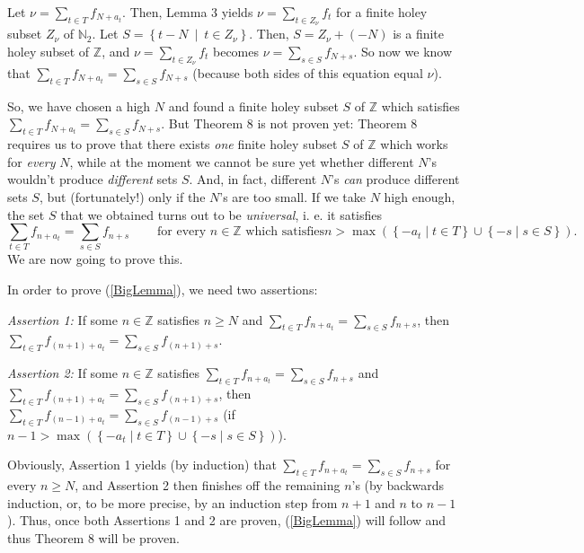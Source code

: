 \documentclass[12pt,final,notitlepage,onecolumn]{article}%
\begin{document}
Let $\nu=\sum\limits_{t\in T}f_{N+a_{t}}$. Then, Lemma 3 yields $\nu
=\sum\limits_{t\in Z_{\nu}}f_{t}$ for a finite holey subset $Z_{\nu}$ of
$\mathbb{N}_{2}$. Let $S=\left\{  t-N\ \mid\ t\in Z_{\nu}\right\}  $. Then,
$S=Z_{\nu}+\left(  -N\right)  $ is a finite holey subset of $\mathbb{Z}$, and
$\nu=\sum\limits_{t\in Z_{\nu}}f_{t}$ becomes $\nu=\sum\limits_{s\in S}%
f_{N+s}$. So now we know that $\sum\limits_{t\in T}f_{N+a_{t}}=\sum
\limits_{s\in S}f_{N+s}$ (because both sides of this equation equal $\nu$).

So, we have chosen a high $N$ and found a finite holey subset $S$ of
$\mathbb{Z}$ which satisfies $\sum\limits_{t\in T}f_{N+a_{t}}=\sum
\limits_{s\in S}f_{N+s}$. But Theorem 8 is not proven yet: Theorem 8 requires
us to prove that there exists \textit{one} finite holey subset $S$ of
$\mathbb{Z}$ which works for \textit{every} $N$, while at the moment we cannot
be sure yet whether different $N$'s wouldn't produce \textit{different} sets
$S$. And, in fact, different $N$'s \textit{can} produce different sets $S$,
but (fortunately!) only if the $N$'s are too small. If we take $N$ high
enough, the set $S$ that we obtained turns out to be \textit{universal}, i. e.
it satisfies
\begin{equation}
\sum\limits_{t\in T}f_{n+a_{t}}=\sum\limits_{s\in S}f_{n+s}%
\ \ \ \ \ \ \ \ \ \ \text{for every }n\in\mathbb{Z}\text{ which satisfies
}n>\max\left(  \left\{  -a_{t}\mid t\in T\right\}  \cup\left\{  -s\mid s\in
S\right\}  \right)  . \label{BigLemma}%
\end{equation}
We are now going to prove this.

In order to prove (\ref{BigLemma}), we need two assertions:

\textit{Assertion 1:} If some $n\in\mathbb{Z}$ satisfies $n\geq N$ and
$\sum\limits_{t\in T}f_{n+a_{t}}=\sum\limits_{s\in S}f_{n+s}$, then
$\sum\limits_{t\in T}f_{\left(  n+1\right)  +a_{t}}=\sum\limits_{s\in
S}f_{\left(  n+1\right)  +s}$.

\textit{Assertion 2:} If some $n\in\mathbb{Z}$ satisfies $\sum\limits_{t\in
T}f_{n+a_{t}}=\sum\limits_{s\in S}f_{n+s}$ and $\sum\limits_{t\in T}f_{\left(
n+1\right)  +a_{t}}=\sum\limits_{s\in S}f_{\left(  n+1\right)  +s}$, then
$\sum\limits_{t\in T}f_{\left(  n-1\right)  +a_{t}}=\sum\limits_{s\in
S}f_{\left(  n-1\right)  +s}$ (if $n-1>\max\left(  \left\{  -a_{t}\mid t\in
T\right\}  \cup\left\{  -s\mid s\in S\right\}  \right)  $).

Obviously, Assertion 1 yields (by induction) that $\sum\limits_{t\in
T}f_{n+a_{t}}=\sum\limits_{s\in S}f_{n+s}$ for every $n\geq N$, and Assertion
2 then finishes off the remaining $n$'s (by backwards induction, or, to be
more precise, by an induction step from $n+1$ and $n$ to $n-1$). Thus, once
both Assertions 1 and 2 are proven, (\ref{BigLemma}) will follow and thus
Theorem 8 will be proven.
\end{document}
